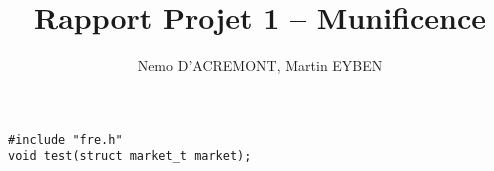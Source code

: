 \documentclass{customClass}
\title{Rapport Projet 1 -- Munificence}
\author{Nemo D'ACREMONT, Martin EYBEN}
\begin{document}
%
%
\mainPage
\tableofcontents{}
\pagebreak{}


\fairemarges

%
%
\setcounter{section}{0}  %


%
%







\lstset{language=C}
\begin{lstlisting}[frame=single]
#include "fre.h"
void test(struct market_t market);
\end{lstlisting}
\end{document}
